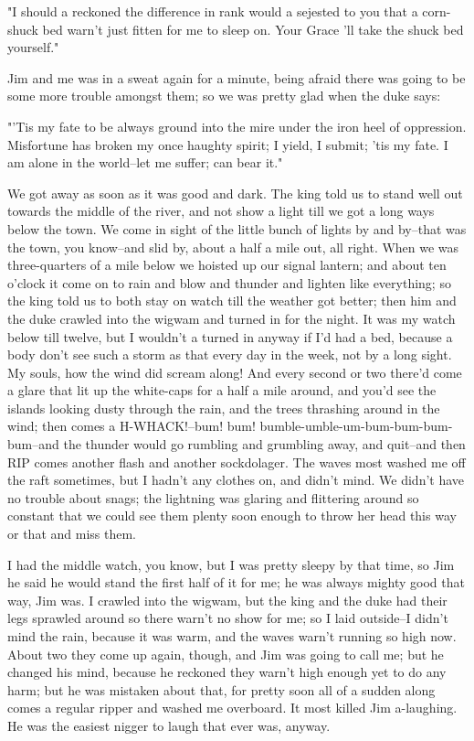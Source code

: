 "I should a reckoned the difference in rank would a sejested to you that
a corn-shuck bed warn't just fitten for me to sleep on.  Your Grace 'll
take the shuck bed yourself."

Jim and me was in a sweat again for a minute, being afraid there was
going to be some more trouble amongst them; so we was pretty glad when
the duke says:

"'Tis my fate to be always ground into the mire under the iron heel of
oppression.  Misfortune has broken my once haughty spirit; I yield, I
submit; 'tis my fate.  I am alone in the world--let me suffer; can bear
it."

We got away as soon as it was good and dark.  The king told us to stand
well out towards the middle of the river, and not show a light till we
got a long ways below the town.  We come in sight of the little bunch of
lights by and by--that was the town, you know--and slid by, about a half
a mile out, all right.  When we was three-quarters of a mile below we
hoisted up our signal lantern; and about ten o'clock it come on to rain
and blow and thunder and lighten like everything; so the king told us to
both stay on watch till the weather got better; then him and the duke
crawled into the wigwam and turned in for the night.  It was my watch
below till twelve, but I wouldn't a turned in anyway if I'd had a bed,
because a body don't see such a storm as that every day in the week, not
by a long sight.  My souls, how the wind did scream along!  And every
second or two there'd come a glare that lit up the white-caps for a half
a mile around, and you'd see the islands looking dusty through the rain,
and the trees thrashing around in the wind; then comes a H-WHACK!--bum!
bum! bumble-umble-um-bum-bum-bum-bum--and the thunder would go rumbling
and grumbling away, and quit--and then RIP comes another flash and
another sockdolager.  The waves most washed me off the raft sometimes,
but I hadn't any clothes on, and didn't mind.  We didn't have no trouble
about snags; the lightning was glaring and flittering around so constant
that we could see them plenty soon enough to throw her head this way or
that and miss them.

I had the middle watch, you know, but I was pretty sleepy by that time,
so Jim he said he would stand the first half of it for me; he was always
mighty good that way, Jim was.  I crawled into the wigwam, but the king
and the duke had their legs sprawled around so there warn't no show for
me; so I laid outside--I didn't mind the rain, because it was warm, and
the waves warn't running so high now.  About two they come up again,
though, and Jim was going to call me; but he changed his mind, because he
reckoned they warn't high enough yet to do any harm; but he was mistaken
about that, for pretty soon all of a sudden along comes a regular ripper
and washed me overboard.  It most killed Jim a-laughing.  He was the
easiest nigger to laugh that ever was, anyway.


